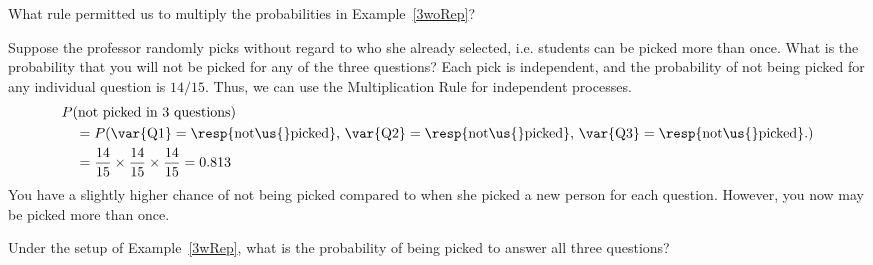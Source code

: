 \begin{exercisewrap}
\begin{nexercise}
What rule permitted us to multiply the probabilities in Example~\ref{3woRep}?\footnotemark
\end{nexercise}
\end{exercisewrap}

\D{\newpage}

\begin{examplewrap}
\begin{nexample}{Suppose the professor randomly picks without regard to who she already selected, i.e. students can be picked more than once. What is the probability that you will not be picked for any of the three questions?}\label{3wRep}
Each pick is independent, and the probability of not being picked for any individual question is $14/15$. Thus, we can use the Multiplication Rule for independent processes.
\begin{align*}
&P(\text{not picked in 3 questions}) \\
&\quad = P(\text{\var{Q1}} = \text{\resp{not\us{}picked}, }\text{\var{Q2}} = \text{\resp{not\us{}picked}, }\text{\var{Q3}} = \text{\resp{not\us{}picked}.}) \\
&\quad = \frac{14}{15}\times\frac{14}{15}\times\frac{14}{15} = 0.813
\end{align*}
You have a slightly higher chance of not being picked compared to when she picked a new person for each question. However, you now may be picked more than once.
\end{nexample}
\end{examplewrap}

\begin{exercisewrap}
\begin{nexercise}
Under the setup of Example~\ref{3wRep}, what is the probability of being picked to answer all three questions?\footnotemark
\end{nexercise}
\end{exercisewrap}

